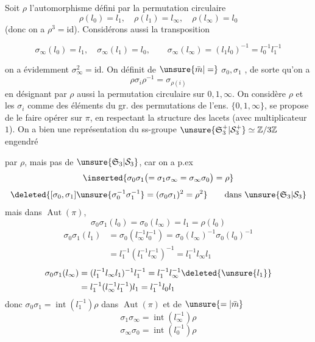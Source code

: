 Soit $\rho$ l'automorphisme défini par la permutation circulaire
\[
\rho(l_0)=l_1,\quad\rho(l_1)=l_\infty,\quad\rho(l_\infty)=l_0
\]
(donc on a $\rho^3=\mathrm{id}$). Considérons aussi la transposition

\[
\sigma_\infty(l_0)=l_1,\quad\sigma_\infty(l_1)=l_0,\qquad
\sigma_\infty(l_\infty)=(l_1l_0)^{-1}=l_0^{-1}l_1^{-1}
\]

on a évidemment $\sigma_\infty^2=\mathrm{id}$. On définit de $\unsure{\bar m|=}$ $\sigma_0,\sigma_1$ , de sorte qu'on a
\[
\rho\sigma_i\rho^{-1}=\sigma_{\rho(i)}
\]
en désignant par $\rho$ aussi la permutation circulaire sur $0,1,\infty$. On considère $\rho$ et les $\sigma_i$ comme des éléments du gr.  des permutations de l'ens. $\{0,1,\infty\}$,  se propose de le faire opérer sur $\pi$, en respectant la structure des lacets (avec  multiplicateur $1$). On a bien une  représentation du ss-groupe $\unsure{\mathfrak S_3^+|\mathcal S_3^+}\simeq\mathbb Z/3\mathbb Z$ engendré

par $\rho$, mais pas de $\unsure{\mathfrak S_3|\mathcal S_3}$, car on a p.ex
\[
\inserted{\sigma_0\sigma_1\bigl(=\sigma_1\sigma_\infty=\sigma_\infty\sigma_0\bigr)=\rho}
\]
\[
\deleted{[\sigma_0,\sigma_1]\unsure{\sigma_0^{-1}\sigma_1^{-1}}=(\sigma_0\sigma_1)^2=\rho^2}\qquad\text{dans }\unsure{\mathfrak S_3|\mathcal S_3}
\]
mais dans $\operatorname{Aut}(\pi)$, 
\[
\sigma_0\sigma_1(l_0)=\sigma_0(l_\infty)=l_1=\rho(l_0)
\]
\[
\begin{aligned}
\sigma_0\sigma_1(l_1)&=\sigma_0(l_\infty^{-1}l_0^{-1})=\sigma_0(l_\infty)^{-1}\sigma_0(l_0)^{-1}\\
&=l_1^{-1}(l_1^{-1}l_\infty^{-1})^{-1}=l_1^{-1}l_\infty l_1
\end{aligned}
\]
\[
\begin{aligned}
\sigma_0\sigma_1(l_\infty)&=(l_1^{-1}l_\infty l_1)^{-1}l_1^{-1}=l_1^{-1}l_\infty^{-1}\deleted{\unsure{l_1}}\\
&=l_1^{-1}(l_\infty^{-1}l_1^{-1})l_1=l_1^{-1}l_0l_1
\end{aligned}
\]
donc $\sigma_0\sigma_1=\operatorname{int}(l_1^{-1})\rho$ dans $\operatorname{Aut}(\pi)$ et de $\unsure{=|\bar m}$
\[
\sigma_1\sigma_\infty=\operatorname{int}(l_\infty^{-1})\rho
\]
\[
\sigma_\infty\sigma_0=\operatorname{int}(l_0^{-1})\rho
\]

